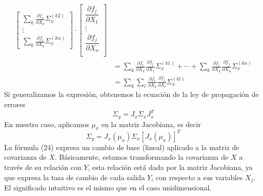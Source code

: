 \documentclass[a4paper, 10pt]{article}
\begin{document}
\begin{equation}
\begin{split}
\begin{bmatrix}
            \sum_{k} {\frac{\partial f_i}{\partial X_k}\Sigma_x^{(k2)}} \\
            \vdots                                                      \\
            \sum_{k} {\frac{\partial f_i}{\partial X_k}\Sigma_x^{(kn)}}
        \end{bmatrix}\cdot
        \begin{bmatrix}
            \dfrac{\partial f_j}{\partial X_1} \\
            \vdots                             \\
            \dfrac{\partial f_j}{\partial X_n} \\
        \end{bmatrix}\\[1em]
        &=\sum_{k} {\frac{\partial f_i}{\partial X_k}\frac{\partial f_j}{\partial X_1}\Sigma_x^{(k1)}} + \cdots + \sum_{k} {\frac{\partial f_i}{\partial X_k}\frac{\partial f_j}{\partial X_n}\Sigma_x^{(kn)}}\\[1em]
        &=\sum_{k}\sum_{l}{\frac{\partial f_i}{\partial X_k}\frac{\partial f_j}{\partial X_l}\Sigma_x^{(kl)}}
    \end{split}
\end{equation}
Si generalizamos la expresión, obtenemos la ecuación de la ley de propagación de errores
\begin{equation}
    \Sigma_y = J_x \Sigma_x J_x^{T}
\end{equation}
En nuestro caso, aplicamos $\mu_x$ en la matriz Jacobiana, es decir
\begin{equation}
    \Sigma_y = J_x(\mu_x) \Sigma_x \left[J_x(\mu_x)\right]^{T}
\end{equation}
La fórmula (24) expresa un cambio de base (lineal) aplicado a la matriz de covarianza de $X$. Básicamente, estamos transformando la covarianza de $X$ a
través de su relación con $Y$, esta relación está dada por la matriz Jacobiana, ya que expresa la tasa de cambio de cada salida $Y_i$ con respecto a sus
variables $X_j$. El significado intuitivo es el mismo que en el caso unidimensional.
\end{document}
